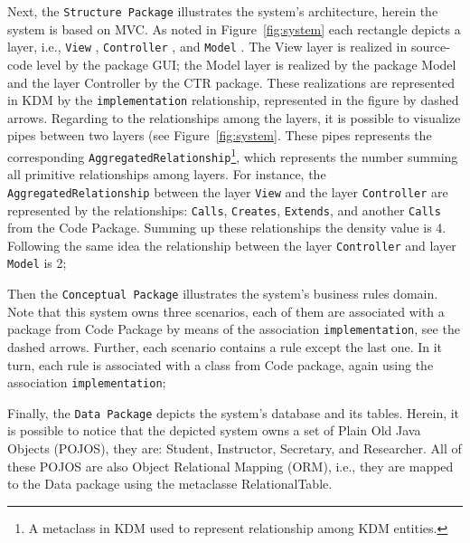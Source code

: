 Next, the \texttt{Structure Package} illustrates the system's architecture, herein the system is based on MVC. As noted in Figure~\ref{fig:system} each rectangle depicts a layer, i.e., \texttt{View} , \texttt{Controller} , and \texttt{Model} . %
The View layer is realized in source-code level by the package GUI; the Model layer is realized by the package Model and the layer Controller by the CTR package. These realizations are represented in KDM by the \texttt{implementation} relationship, represented in the figure by dashed arrows. Regarding to the relationships among the layers, it is possible to visualize pipes between two layers (see Figure~\ref{fig:system}. These pipes represents the corresponding \texttt{AggregatedRelationship}\footnote{A metaclass in KDM used to represent relationship among KDM entities.}, which represents the number summing all primitive relationships among layers. For instance, the \texttt{AggregatedRelationship} between the layer \texttt{View} and the layer \texttt{Controller} are represented by the relationships: \texttt{Calls}, \texttt{Creates}, \texttt{Extends}, and another \texttt{Calls} from the Code Package. Summing up these relationships the density value is 4. Following the same idea the relationship between the layer \texttt{Controller} and layer \texttt{Model} is 2;  
  
Then the \texttt{Conceptual Package} illustrates the system's business rules domain. Note that this system owns three scenarios, each of them are associated with a package from Code Package by means of the association \texttt{implementation}, see the dashed arrows. Further, each scenario contains a rule except the last one. In it turn, each rule is associated with a class from Code package, again using the association \texttt{implementation};

Finally, the \texttt{Data Package} depicts the system's database and its tables. Herein, it is possible to notice that the depicted system owns a set of Plain Old Java Objects (POJOS), they are: Student, Instructor, Secretary, and Researcher. All of these POJOS are also Object Relational Mapping (ORM), i.e., they are mapped to the Data package using the metaclasse RelationalTable. 

